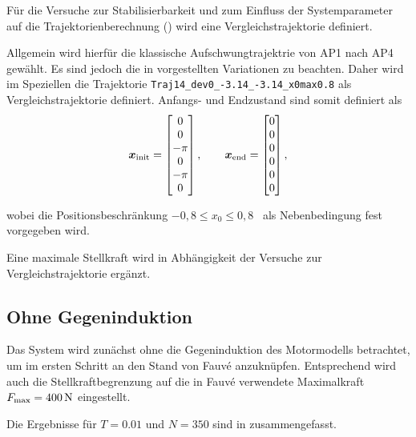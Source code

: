 Für die Versuche zur Stabilisierbarkeit und zum Einfluss der Systemparameter auf die Trajektorienberechnung () wird eine Vergleichstrajektorie definiert.

Allgemein wird hierfür die klassische Aufschwungtrajektrie von AP1 nach AP4 gewählt. Es sind jedoch die in  vorgestellten Variationen zu beachten. Daher wird im Speziellen die Trajektorie 
\texttt{Traj14\_dev0\_-3.14\_-3.14\_x0max0.8} 
als Vergleichstrajektorie definiert. 
Anfangs- und Endzustand sind somit definiert als
\begin{align*}
	\boldsymbol{x}_{\mathrm{init}} =
	\begin{bmatrix}
		0 \\ 0 \\ -\pi \\ 0 \\ -\pi \\ 0
	\end{bmatrix}	, \qquad
	\boldsymbol{x}_{\mathrm{end}} =
	\begin{bmatrix}
		0 \\ 0 \\ 0 \\ 0 \\ 0 \\ 0
	\end{bmatrix} ,
\end{align*}


wobei die Positionsbeschränkung $-0,8 \leq x_0 \leq 0,8$ \ als Nebenbedingung fest vorgegeben wird.

Eine maximale Stellkraft wird in Abhängigkeit der Versuche zur Vergleichstrajektorie ergänzt.


\subsection{Ohne Gegeninduktion}\label{subsec:ohneInd}

Das System wird zunächst ohne die Gegeninduktion des Motormodells betrachtet, um im ersten Schritt an den Stand von Fauvé \cite{fauve} anzuknüpfen. Entsprechend wird auch die Stellkraftbegrenzung auf die in Fauvé \cite{fauve} verwendete Maximalkraft $F_{\mathrm{max}}=400\,\mathrm{N}$ eingestellt. 

Die Ergebnisse für $T=0.01$ und $N=350$ sind in  zusammengefasst.

